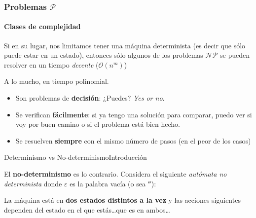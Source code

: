 \documentclass[spanish, c]{beamer}
\newcommand{\bigO}{\mathcal{O}}
\begin{document}
\begin{frame}
    \frametitle{Problemas \texorpdfstring{$\mathcal{P}$}{P}}
    \framesubtitle{Clases de complejidad}

    Si en su lugar, nos limitamos tener una máquina \alert{determinista} (es decir que sólo puede estar en un estado), entonces sólo algunos de los problemas $\mathcal{NP}$ se pueden resolver en un tiempo \textit{decente} ($\bigO(n^m)$)
    \begin{center}
        \Large A lo mucho, en tiempo \alert{polinomial}.
    \end{center}

    \begin{itemize}
        \item Son problemas de \textbf{decisión}: ¿Puedes? \textit{Yes or no}. \pause
        \item Se verifican \textbf{fácilmente}: si ya tengo una solución para comparar, puedo ver si voy por buen camino o si el problema está bien hecho.
        \item Se resuelven \textbf{siempre} con el mismo número de pasos (en el peor de los casos)
    \end{itemize}
\end{frame}

\begin{frame}{Determinismo vs No-determinismo}{Introducción}

    El \textbf{no-determinismo} es lo contrario. Considera el siguiente \textit{autómata no determinista} donde $\varepsilon$ es la palabra vacía (o sea \texttt{''}):

    \bigskip

    \begin{center}
      \end{center}
      
      La máquina está en \textbf{dos estados distintos a la vez} y las acciones siguientes dependen del estado en el que estás\dots que es en ambos\dots

\end{frame}
\end{document}
